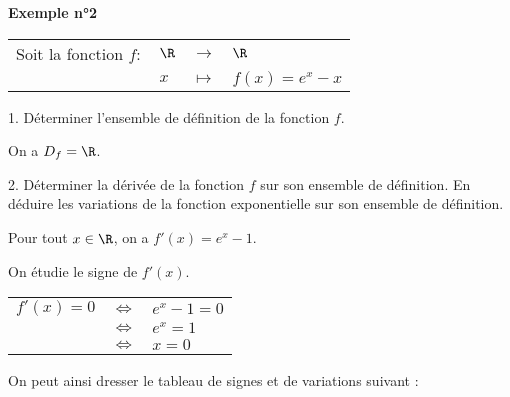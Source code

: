 \newpage

\vspace*{-2cm}

\textbf{Exemple n°2} \\

\begin{tabular}{llll}
\hspace*{-.3cm} Soit la fonction $f:$ & $\R$ & $\longrightarrow$ & $\R$ \\
& $x$ & $\longmapsto$ & $f\left(x\right) = e^x - x$ \\
\end{tabular}

\vspace*{.3cm}

1. Déterminer l'ensemble de définition de la fonction $f$. \\

\vspace*{-.2cm}

On a $D_f = \R$. \\

\vspace*{-.2cm}

2. Déterminer la dérivée de la fonction $f$ sur son ensemble de définition. En déduire les variations de la fonction exponentielle sur son ensemble de définition. \\

\vspace*{-.2cm}

Pour tout $x \in \R$, on a $f'(x) = e^x - 1$. \\

\vspace*{-.2cm}

On étudie le signe de $f'(x)$. \\

\begin{tabular}{lll}
\hspace*{-.3cm} $f'(x) = 0$ & $\Longleftrightarrow$ & $e^x - 1 = 0$ \\
& $\Longleftrightarrow$ & $e^x = 1$ \\
& $\Longleftrightarrow$ & $x = 0$ \\
\end{tabular} 

\vspace*{.3cm}

On peut ainsi dresser le tableau de signes et de variations suivant : \\

